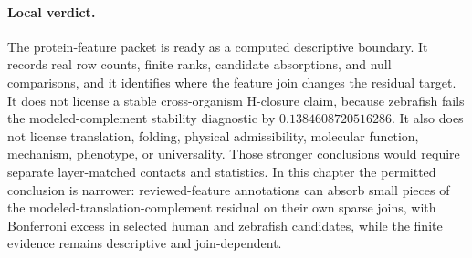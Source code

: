 \paragraph{Local verdict.}
The protein-feature packet is ready as a computed descriptive boundary. It records real row counts, finite ranks, candidate absorptions, and null comparisons, and it identifies where the feature join changes the residual target. It does not license a stable cross-organism H-closure claim, because zebrafish fails the modeled-complement stability diagnostic by $0.1384608720516286$. It also does not license translation, folding, physical admissibility, molecular function, mechanism, phenotype, or universality. Those stronger conclusions would require separate layer-matched contacts and statistics. In this chapter the permitted conclusion is narrower: reviewed-feature annotations can absorb small pieces of the modeled-translation-complement residual on their own sparse joins, with Bonferroni excess in selected human and zebrafish candidates, while the finite evidence remains descriptive and join-dependent.
